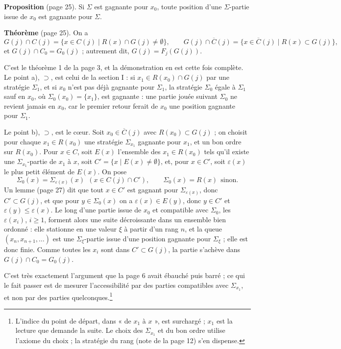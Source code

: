 \documentclass[11pt,a4paper]{article}
\begin{document}
\textbf{Proposition} (page 25). Si $\Sigma$ est gagnante pour $x_0$, toute
position d'une $\Sigma$-partie issue de $x_0$ est gagnante pour $\Sigma$.

\textbf{Théorème} (page 25). On a
\[
G(j) \cap C(j) = \{x \in C(j) \mid R(x) \cap G(j) \neq \emptyset\},
\qquad
G(j) \cap \overline{C}(j) = \{x \in \overline{C}(j) \mid R(x) \subset G(j)\},
\]
et $G(j) \cap C_0 = G_0(j)$ ; autrement dit, $G(j) = F_j(G(j))$.

C'est le théorème 1 de la page 3, et la démonstration en est cette fois
complète. Le point a), $\supset$, est celui de la section I : si
$x_1 \in R(x_0) \cap G(j)$ par une stratégie $\Sigma_1$, et si $x_0$ n'est
pas déjà gagnante pour $\Sigma_1$, la stratégie $\Sigma_0$ égale à
$\Sigma_1$ sauf en $x_0$, où $\Sigma_0(x_0) = \{x_1\}$, est gagnante : une
partie jouée suivant $\Sigma_0$ ne revient jamais en $x_0$, car le premier
retour ferait de $x_0$ une position gagnante pour $\Sigma_1$.

Le point b), $\supset$, est le cœur. Soit $x_0 \in \overline{C}(j)$ avec
$R(x_0) \subset G(j)$ ; on choisit pour chaque $x_1 \in R(x_0)$ une stratégie
$\Sigma_{x_1}$ gagnante pour $x_1$, et un bon ordre sur $R(x_0)$. Pour
$x \in C$, soit $E(x)$ l'ensemble des $x_1 \in R(x_0)$ tels qu'il existe une
$\Sigma_{x_1}$-partie de $x_1$ à $x$, soit
$C' = \{x \mid E(x) \neq \emptyset\}$, et, pour $x \in C'$, soit $\varepsilon(x)$
le plus petit élément de $E(x)$. On pose
\[
\Sigma_0(x) = \Sigma_{\varepsilon(x)}(x) \ \ (x \in C(j) \cap C'),
\qquad
\Sigma_0(x) = R(x) \ \ \text{sinon}.
\]
Un lemme (page 27) dit que tout $x \in C'$ est gagnant pour
$\Sigma_{\varepsilon(x)}$, donc $C' \subset G(j)$, et que pour
$y \in \Sigma_0(x)$ on a $\varepsilon(x) \in E(y)$, donc $y \in C'$ et
$\varepsilon(y) \leqslant \varepsilon(x)$. Le long d'une partie issue de
$x_0$ et compatible avec $\Sigma_0$, les $\varepsilon(x_i)$, $i \geqslant 1$,
forment alors une suite décroissante dans un ensemble bien ordonné : elle
stationne en une valeur $\xi$ à partir d'un rang $n$, et la queue
$(x_n, x_{n+1}, \ldots)$ est une $\Sigma_\xi$-partie issue d'une position
gagnante pour $\Sigma_\xi$ ; elle est donc finie. Comme toutes les $x_i$ sont
dans $C' \subset G(j)$, la partie s'achève dans $G(j) \cap C_0 = G_0(j)$.

C'est très exactement l'argument que la page 6 avait ébauché puis barré ; ce
qui le fait passer est de mesurer l'accessibilité par des parties compatibles
avec $\Sigma_{x_1}$, et non par des parties quelconques.\footnote{L'indice du
point de départ, dans « de $x_1$ à $x$ », est surchargé ; $x_1$ est la
lecture que demande la suite. Le choix des $\Sigma_{x_1}$ et du bon ordre
utilise l'axiome du choix ; la stratégie du rang (note de la page 12) s'en
dispense.}
\end{document}
